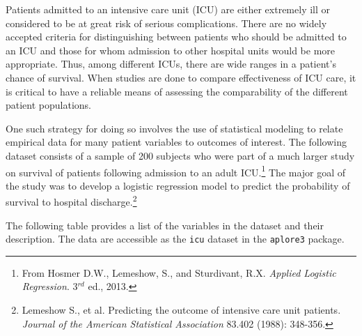 \documentclass[letterpaper,12pt,twoside,]{pinp}
\begin{document}
Patients admitted to an intensive care unit (ICU) are either extremely
ill or considered to be at great risk of serious complications. There
are no widely accepted criteria for distinguishing between patients who
should be admitted to an ICU and those for whom admission to other
hospital units would be more appropriate. Thus, among different ICUs,
there are wide ranges in a patient's chance of survival. When studies
are done to compare effectiveness of ICU care, it is critical to have a
reliable means of assessing the comparability of the different patient
populations.

One such strategy for doing so involves the use of statistical modeling
to relate empirical data for many patient variables to outcomes of
interest. The following dataset consists of a sample of 200 subjects who
were part of a much larger study on survival of patients following
admission to an adult
ICU.\footnote{From Hosmer D.W., Lemeshow, S., and Sturdivant, R.X. \textit{Applied Logistic Regression}. 3$^{rd}$ ed., 2013.}
The major goal of the study was to develop a logistic regression model
to predict the probability of survival to hospital
discharge.\footnote{Lemeshow S., et al. Predicting the outcome of intensive care unit patients. \textit{Journal of the American Statistical Association} 83.402 (1988): 348-356.}

The following table provides a list of the variables in the dataset and
their description. The data are accessible as the \texttt{icu} dataset
in the \texttt{aplore3} package.
\end{document}
